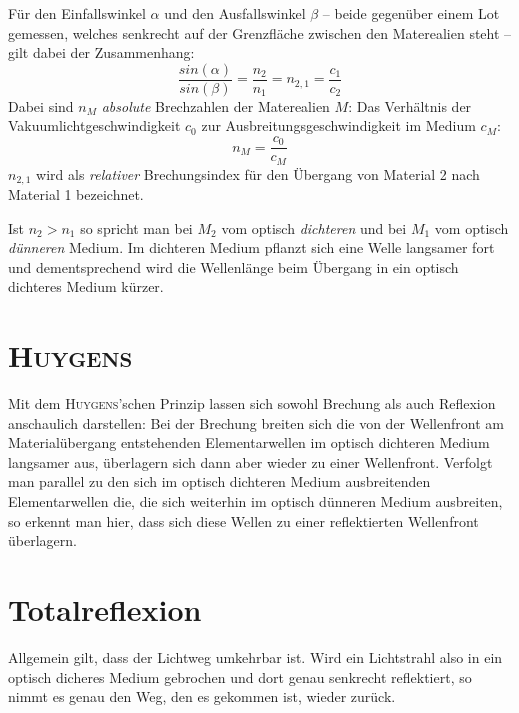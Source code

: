 Für den Einfallswinkel \(\alpha\) und den Ausfallswinkel \(\beta\) -- beide gegenüber einem Lot gemessen, welches senkrecht auf der Grenzfläche zwischen den Materealien steht -- gilt dabei der Zusammenhang:
\begin{equation}
   \frac{sin(\alpha)}{sin(\beta)} = \frac{n_2}{n_1} = n_{2,1} = \frac{c_1}{c_2}
   \label{eq_brechungsgesetz}
\end{equation}
Dabei sind \(n_M\) \emph{absolute} Brechzahlen der Materealien \(M\): Das Verhältnis der Vakuumlichtgeschwindigkeit \(c_0\) zur Ausbreitungsgeschwindigkeit im Medium \(c_M\):
\begin{equation}
   n_M = \frac{c_0}{c_M}
   \label{eq_absoluter_brechungsindex}
\end{equation}
 \(n_{2,1}\) wird als \textit{relativer} Brechungsindex für den Übergang von Material 2 nach Material 1 bezeichnet.

Ist \(n_2 > n_1\) so spricht man bei \(M_2\) vom optisch \textit{dichteren} und bei \(M_1\) vom optisch \textit{dünneren} Medium. Im dichteren Medium pflanzt sich eine Welle langsamer fort und dementsprechend wird die Wellenlänge beim Übergang in ein optisch dichteres Medium kürzer.
 



	\section{\textsc{Huygens}}

Mit dem \textsc{Huygens}'schen Prinzip lassen sich sowohl Brechung als auch Reflexion anschaulich darstellen: Bei der Brechung breiten sich die von der Wellenfront am Materialübergang entstehenden Elementarwellen im optisch dichteren Medium langsamer aus, überlagern sich dann aber wieder zu einer Wellenfront. Verfolgt man parallel zu den sich im optisch dichteren Medium ausbreitenden Elementarwellen die, die sich weiterhin im optisch dünneren Medium ausbreiten, so erkennt man hier, dass sich diese Wellen zu einer reflektierten Wellenfront überlagern.


	\section{Totalreflexion}

Allgemein gilt, dass der Lichtweg umkehrbar ist. Wird ein Lichtstrahl also in ein optisch dicheres Medium gebrochen und dort genau senkrecht reflektiert, so nimmt es genau den Weg, den es gekommen ist, wieder zurück. 

